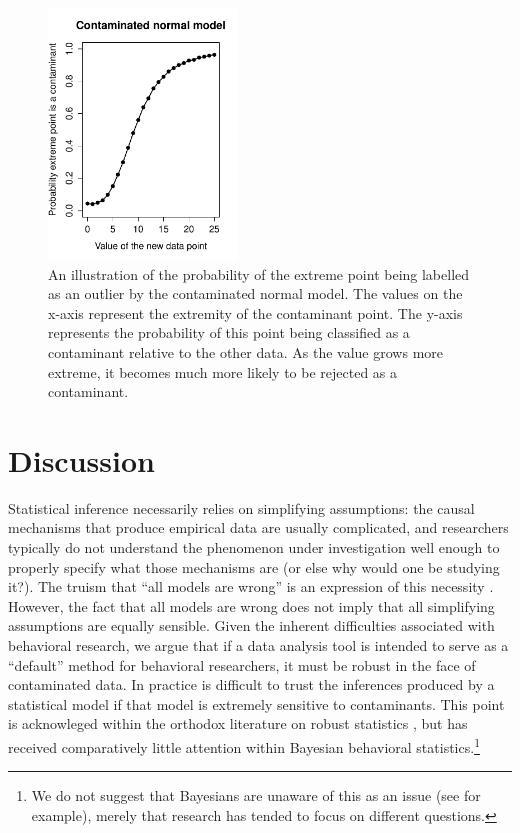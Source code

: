 \documentclass[doc]{apa6}
\begin{document}
{\begin{figure}[p]
    \centering
\includegraphics[width=5.0cm]{toyContRejection_cn.pdf}
    \caption{  An illustration of the probability of the extreme point being labelled as an outlier by the contaminated normal model. The values on the x-axis represent the extremity of the contaminant point. The y-axis represents the probability of this point being classified as a contaminant relative to the other data.
    As the value grows more extreme, it becomes much more likely to be rejected as a contaminant.  }
    \label{cont_prob}
\end{figure}


\section{Discussion}

Statistical inference necessarily relies on simplifying assumptions: the causal mechanisms that produce empirical data are usually complicated, and researchers typically do not understand the phenomenon under investigation well enough to properly specify what those mechanisms are (or else why would one be studying it?). The truism that ``all models are wrong'' is an expression of this necessity \parencite{box_science_1976}. However, the fact that all models are wrong does not imply that all simplifying assumptions are equally sensible. Given the inherent difficulties associated with behavioral research, we argue that if a data analysis tool is intended to serve as a ``default'' method for behavioral researchers, it must be robust in the face of contaminated data. In practice is difficult to trust the inferences produced by a statistical model if that model is extremely sensitive to contaminants. This point is acknowleged within the orthodox literature on robust statistics \parencite{wilcox_introduction_2012}, but has received comparatively little attention within Bayesian behavioral statistics.\footnote{We do not suggest that Bayesians are unaware of this as an issue (see \textcite{wang_general_2015} for example), merely that research has tended to focus on different questions.}

}
\end{document}
